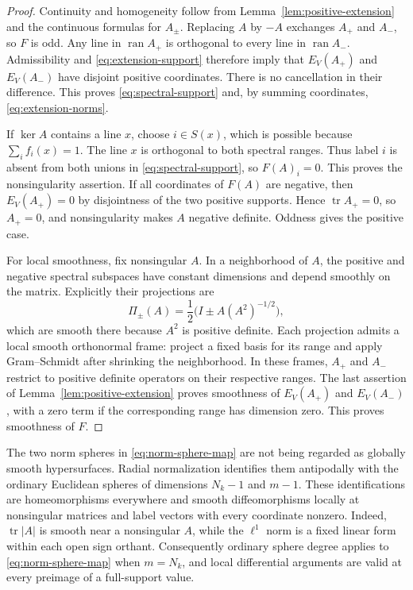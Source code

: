 \begin{proof}
Continuity and homogeneity follow from Lemma~\ref{lem:positive-extension}
and the continuous formulas for $A_\pm$.  Replacing $A$ by $-A$ exchanges
$A_+$ and $A_-$, so $F$ is odd.  Any line in
$\operatorname{ran}A_+$ is orthogonal to every line in
$\operatorname{ran}A_-$.  Admissibility and
\eqref{eq:extension-support} therefore imply that $E_V(A_+)$ and
$E_V(A_-)$ have disjoint positive coordinates.  There is no cancellation
in their difference.  This proves \eqref{eq:spectral-support} and, by
summing coordinates, \eqref{eq:extension-norms}.

If $\ker A$ contains a line $x$, choose $i\in S(x)$, which is possible
because $\sum_i f_i(x)=1$.  The line $x$ is orthogonal to both spectral
ranges.  Thus label $i$ is absent from both unions in
\eqref{eq:spectral-support}, so $F(A)_i=0$.  This proves the
nonsingularity assertion.  If all coordinates of $F(A)$ are negative,
then $E_V(A_+)=0$ by disjointness of the two positive supports.  Hence
$\operatorname{tr}A_+=0$, so $A_+=0$, and nonsingularity makes $A$
negative definite.  Oddness gives the positive case.

For local smoothness, fix nonsingular $A$.  In a neighborhood of $A$,
the positive and negative spectral subspaces have constant dimensions
and depend smoothly on the matrix.  Explicitly their projections are
\[
 \Pi_\pm(A)=\frac12\bigl(I\pm A(A^2)^{-1/2}\bigr),
\]
which are smooth there because $A^2$ is positive definite.
Each projection admits a local smooth orthonormal frame: project a fixed
basis for its range and apply Gram--Schmidt after shrinking the
neighborhood.  In these frames, $A_+$ and $A_-$ restrict to positive
definite operators on their respective ranges.  The last assertion of
Lemma~\ref{lem:positive-extension} proves smoothness of $E_V(A_+)$ and
$E_V(A_-)$, with a zero term if the corresponding range has dimension
zero.  This proves smoothness of $F$.
\end{proof}

The two norm spheres in \eqref{eq:norm-sphere-map} are not being regarded
as globally smooth hypersurfaces.  Radial normalization identifies them
antipodally with the ordinary Euclidean spheres of dimensions $N_k-1$
and $m-1$.  These identifications are homeomorphisms everywhere and
smooth diffeomorphisms locally at nonsingular matrices and label vectors
with every coordinate nonzero.  Indeed, $\operatorname{tr}|A|$ is smooth
near a nonsingular $A$, while the $\ell^1$ norm is a fixed linear form
within each open sign orthant.  Consequently ordinary sphere degree
applies to \eqref{eq:norm-sphere-map} when $m=N_k$, and local differential arguments
are valid at every preimage of a full-support value.
